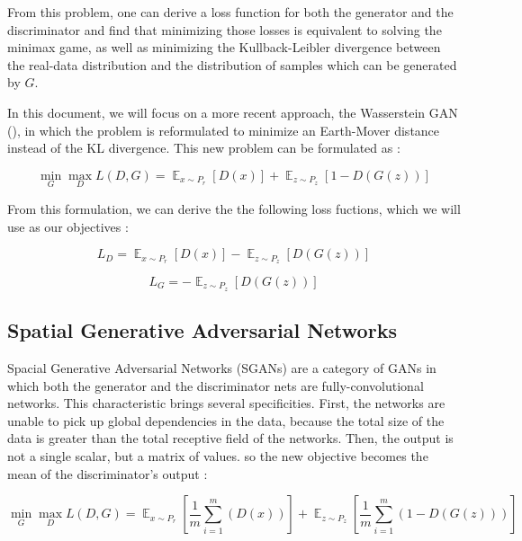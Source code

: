 \documentclass{article}
\begin{document}
		From this problem, one can derive a loss function for both the generator and the discriminator and find that minimizing those losses is equivalent to solving the minimax game, as well as minimizing the Kullback-Leibler divergence between the real-data distribution and the distribution of samples which can be generated by $G$. 
		
		In this document, we will focus on a more recent approach, the Wasserstein GAN (\cite{arjovski2017}), in which the problem is reformulated to minimize an Earth-Mover distance instead of the KL divergence. This new problem can be formulated as :
		
		\begin{equation}
			\min_G \max_D L(D, G) = \mathop{\mathbb{E}}_{x\sim P_r} [D(x)] + \mathop{\mathbb{E}}_{z\sim P_z} [1-D(G(z))]
		\end{equation}
		
		From this formulation, we can derive the  the following loss fuctions, which we will use as our objectives :
		
		\begin{equation}
			L_{D} =  \mathop{\mathbb{E}}_{x\sim P_r} [D(x)] - \mathop{\mathbb{E}}_{z\sim P_z} [D(G(z))]
		\end{equation}
		
		\begin{equation}
			L_{G} = -\mathop{\mathbb{E}}_{z\sim P_z} [D(G(z))]
		\end{equation}
	
	\subsection{Spatial Generative Adversarial Networks}
		
		Spacial Generative Adversarial Networks (SGANs)\cite{Jetchev} are a category of GANs in which both the generator and the discriminator nets are fully-convolutional networks. This characteristic brings several specificities. First, the networks are unable to pick up global dependencies in the data, because the total size of the data is greater than the total receptive field of the networks. Then, the output is not a single scalar, but a matrix of values. so the new objective becomes the mean of the discriminator's output :		
		
		\begin{equation}
			\min_G \max_D L(D, G) = \mathop{\mathbb{E}}_{x\sim P_r} [\frac{1}{m}\sum_{i=1}^{m} (D(x))] + \mathop{\mathbb{E}}_{z\sim P_z} [\frac{1}{m}\sum_{i=1}^{m}  (1-D(G(z)))]
		\end{equation}
		
\end{document}
